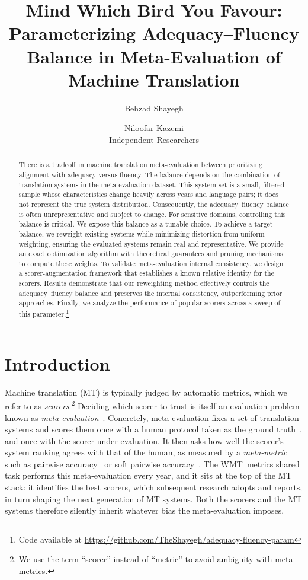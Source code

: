 \documentclass[11pt]{article}
\title{Mind Which Bird You Favour: Parameterizing Adequacy–Fluency Balance in Meta-Evaluation of Machine Translation}
\author{Behzad Shayegh \and
  Niloofar Kazemi \\
  Independent Researchers}
\begin{document}
\maketitle
\begingroup
\renewcommand\thefootnote{$\star$}
\endgroup
\begin{abstract}
There is a tradeoff in machine translation meta-evaluation between prioritizing alignment with adequacy versus fluency. The balance depends on the combination of translation systems in the meta-evaluation dataset. This system set is a small, filtered sample whose characteristics change heavily across years and language pairs; it does not represent the true system distribution. Consequently, the adequacy–fluency balance is often unrepresentative and subject to change. For sensitive domains, controlling this balance is critical. We expose this balance as a tunable choice. To achieve a target balance, we reweight existing systems while minimizing distortion from uniform weighting, ensuring the evaluated systems remain real and representative. We provide an exact optimization algorithm with theoretical guarantees and pruning mechanisms to compute these weights. To validate meta-evaluation internal consistency, we design a scorer-augmentation framework that establishes a known relative identity for the scorers. Results demonstrate that our reweighting method effectively controls the adequacy–fluency balance and preserves the internal consistency, outperforming prior approaches. Finally, we analyze the performance of popular scorers across a sweep of this parameter.\footnote{Code available at \href{https://github.com/TheShayegh/adequacy-fluency-param}{https://github.com/TheShayegh/adequacy-fluency-param}}
\end{abstract}

\section{Introduction}

Machine translation (MT) is typically judged by automatic metrics, which we refer to as \emph{scorers}.\footnote{We use the term ``scorer'' instead of ``metric'' to avoid ambiguity with meta-metrics.} Deciding which scorer to trust is itself an evaluation problem known as \emph{meta-evaluation}~\citep{callison-burch-etal-2007-meta}. Concretely, meta-evaluation fixes a set of translation systems and scores them once with a human protocol taken as the ground truth~\citep[Multidimensional Quality Metrics, MQM;][]{freitag-etal-2021-experts}, and once with the scorer under evaluation. It then asks how well the scorer's system ranking agrees with that of the human, as measured by a \emph{meta-metric} such as pairwise accuracy~\citep[PA;][]{kocmi-etal-2021-ship} or soft pairwise accuracy~\citep[SPA;][]{thompson-etal-2024-improving}. The WMT~metrics shared task \citep{freitag-etal-2023-results} performs this meta-evaluation every year, and it sits at the top of the MT stack: it identifies the best scorers, which subsequent research adopts and reports, in turn shaping the next generation of MT systems. Both the scorers and the MT systems therefore silently inherit whatever bias the meta-evaluation imposes.
\end{document}
